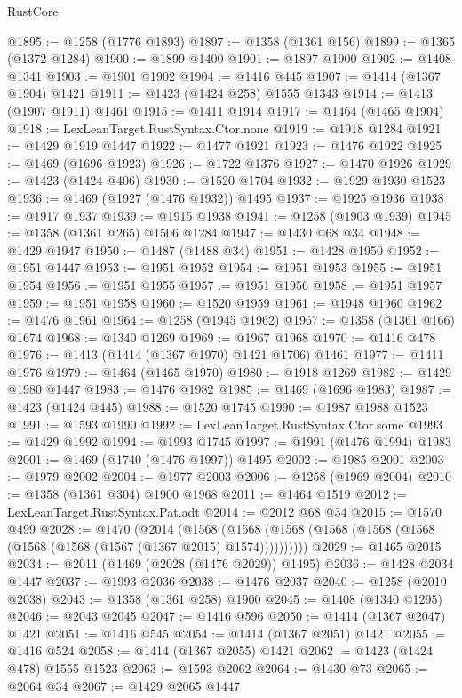\begin{lexlean}{RustCore}
\begin{coremodule}
{\begin{coremodule}
{{{{{{{{{{{{{{{{{{{{{{{{{{{{{{{{{{{{{{{{{{{{{{{@1895 := @1258 (@1776 @1893)
@1897 := @1358 (@1361 @156)
@1899 := @1365 (@1372 @1284)
@1900 := @1899 @1400
@1901 := @1897 @1900
@1902 := @1408 @1341
@1903 := @1901 @1902
@1904 := @1416 @445
@1907 := @1414 (@1367 @1904) @1421
@1911 := @1423 (@1424 @258) @1555 @1343
@1914 := @1413 (@1907 @1911) @1461
@1915 := @1411 @1914
@1917 := @1464 (@1465 @1904)
@1918 := LexLeanTarget.RustSyntax.Ctor.none
@1919 := @1918 @1284
@1921 := @1429 @1919 @1447
@1922 := @1477 @1921
@1923 := @1476 @1922
@1925 := @1469 (@1696 @1923)
@1926 := @1722 @1376
@1927 := @1470 @1926
@1929 := @1423 (@1424 @406)
@1930 := @1520 @1704
@1932 := @1929 @1930 @1523
@1936 := @1469 (@1927 (@1476 @1932)) @1495
@1937 := @1925 @1936
@1938 := @1917 @1937
@1939 := @1915 @1938
@1941 := @1258 (@1903 @1939)
@1945 := @1358 (@1361 @265) @1506 @1284
@1947 := @1430 @68 @34
@1948 := @1429 @1947
@1950 := @1487 (@1488 @34)
@1951 := @1428 @1950
@1952 := @1951 @1447
@1953 := @1951 @1952
@1954 := @1951 @1953
@1955 := @1951 @1954
@1956 := @1951 @1955
@1957 := @1951 @1956
@1958 := @1951 @1957
@1959 := @1951 @1958
@1960 := @1520 @1959
@1961 := @1948 @1960
@1962 := @1476 @1961
@1964 := @1258 (@1945 @1962)
@1967 := @1358 (@1361 @166) @1674
@1968 := @1340 @1269
@1969 := @1967 @1968
@1970 := @1416 @478
@1976 := @1413 (@1414 (@1367 @1970) @1421 @1706) @1461
@1977 := @1411 @1976
@1979 := @1464 (@1465 @1970)
@1980 := @1918 @1269
@1982 := @1429 @1980 @1447
@1983 := @1476 @1982
@1985 := @1469 (@1696 @1983)
@1987 := @1423 (@1424 @445)
@1988 := @1520 @1745
@1990 := @1987 @1988 @1523
@1991 := @1593 @1990
@1992 := LexLeanTarget.RustSyntax.Ctor.some
@1993 := @1429 @1992
@1994 := @1993 @1745
@1997 := @1991 (@1476 @1994) @1983
@2001 := @1469 (@1740 (@1476 @1997)) @1495
@2002 := @1985 @2001
@2003 := @1979 @2002
@2004 := @1977 @2003
@2006 := @1258 (@1969 @2004)
@2010 := @1358 (@1361 @304) @1900 @1968
@2011 := @1464 @1519
@2012 := LexLeanTarget.RustSyntax.Pat.adt
@2014 := @2012 @68 @34
@2015 := @1570 @499
@2028 := @1470
    (@2014
      (@1568 (@1568 (@1568 (@1568 (@1568 (@1568 (@1568 (@1568 (@1567 (@1367 @2015) @1574))))))))))
@2029 := @1465 @2015
@2034 := @2011 (@1469 (@2028 (@1476 @2029)) @1495)
@2036 := @1428 @2034 @1447
@2037 := @1993 @2036
@2038 := @1476 @2037
@2040 := @1258 (@2010 @2038)
@2043 := @1358 (@1361 @258) @1900
@2045 := @1408 (@1340 @1295)
@2046 := @2043 @2045
@2047 := @1416 @596
@2050 := @1414 (@1367 @2047) @1421
@2051 := @1416 @545
@2054 := @1414 (@1367 @2051) @1421
@2055 := @1416 @524
@2058 := @1414 (@1367 @2055) @1421
@2062 := @1423 (@1424 @478) @1555 @1523
@2063 := @1593 @2062
@2064 := @1430 @73
@2065 := @2064 @34
@2067 := @1429 @2065 @1447
}}}}}}}}}}}}}}}}}}}}}}}}}}}}}}}}}}}}}}}}}}}}}}}
\end{coremodule}}
\end{coremodule}
\end{lexlean}
